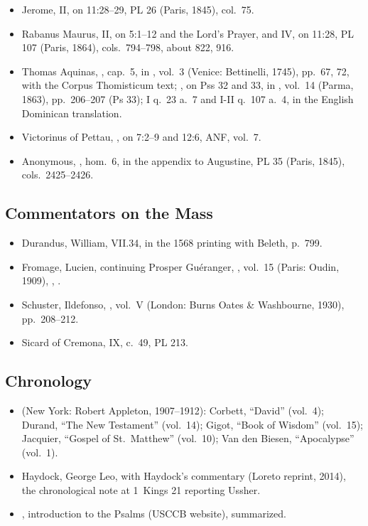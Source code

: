 {\begin{itemize}[leftmargin=1.2em,itemsep=.25em]
\item Jerome,  II, on 11:28--29, PL 26 (Paris,
1845), col.~75.
\item Rabanus Maurus,  II, on 5:1--12 and the
Lord's Prayer, and IV, on 11:28, PL 107 (Paris, 1864), cols.~794--798,
about 822, 916.
\item Thomas Aquinas, , cap.~5, in
, vol.~3 (Venice: Bettinelli, 1745), pp.~67, 72, with the
Corpus Thomisticum text; , on Pss 32 and
33, in , vol.~14 (Parma, 1863), pp.~206--207 (Ps 33);
 I q.~23 a.~7 and I-II q.~107 a.~4, in the English
Dominican translation.
\item Victorinus of Pettau, , on 7:2--9 and
12:6, ANF, vol.~7.
\item Anonymous, , hom.~6, in the appendix to
Augustine, PL 35 (Paris, 1845), cols.~2425--2426.
\end{itemize}

\subsection*{Commentators on the Mass}
\begin{itemize}[leftmargin=1.2em,itemsep=.25em]
\item Durandus, William,  VII.34, in the
1568 printing with Beleth, p.~799.
\item Fromage, Lucien, continuing Prosper Guéranger, , vol.~15 (Paris: Oudin, 1909), , .
\item Schuster, Ildefonso, ,
vol.~V (London: Burns Oates \& Washbourne, 1930), pp.~208--212.
\item Sicard of Cremona,  IX, c.~49, PL 213.
\end{itemize}

\subsection*{Chronology}
\begin{itemize}[leftmargin=1.2em,itemsep=.25em]
\item {} (New York: Robert Appleton, 1907--1912):
Corbett, ``David'' (vol.~4); Durand, ``The New Testament'' (vol.~14); Gigot,
``Book of Wisdom'' (vol.~15); Jacquier, ``Gospel of St.~Matthew'' (vol.~10);
Van den Biesen, ``Apocalypse'' (vol.~1).
\item Haydock, George Leo,  with Haydock's commentary
(Loreto reprint, 2014), the chronological note at 1~Kings 21 reporting
Ussher.
\item {}, introduction to the Psalms
(USCCB website), summarized.
\end{itemize}
\par}
